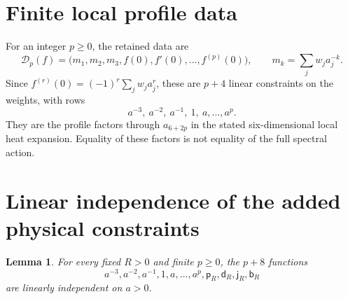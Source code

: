 \documentclass[11pt,letterpaper]{article}
\newtheorem{lemma}{Lemma}
\newcommand{\pker}{\mathsf p}
\newcommand{\jker}{\mathsf j}
\newcommand{\bker}{\mathsf b}
\newcommand{\dker}{\mathsf d}
\begin{document}
\section{Finite local profile data}

For an integer $p\geq0$, the retained data are
\begin{equation}
 \mathcal D_p(f)=\bigl(m_1,m_2,m_3,f(0),f'(0),\ldots,f^{(p)}(0)\bigr),
 \qquad m_k=\sum_j w_j a_j^{-k}.
\end{equation}
Since $f^{(r)}(0)=(-1)^r\sum_jw_ja_j^r$, these are $p+4$ linear constraints on the weights, with rows
\begin{equation}
 a^{-3},\ a^{-2},\ a^{-1},\ 1,\ a,\ldots,a^p.
\end{equation}
They are the profile factors through $a_{6+2p}$ in the stated six-dimensional local heat expansion. Equality of these factors is not equality of the full spectral action.

\section{Linear independence of the added physical constraints}

\begin{lemma}\label{lem:independence}
For every fixed $R>0$ and finite $p\geq0$, the $p+8$ functions
\begin{equation}
 a^{-3},a^{-2},a^{-1},1,a,\ldots,a^p,
 \pker_R,\dker_R,\jker_R,\bker_R
\end{equation}
are linearly independent on $a>0$.
\end{lemma}
\end{document}
